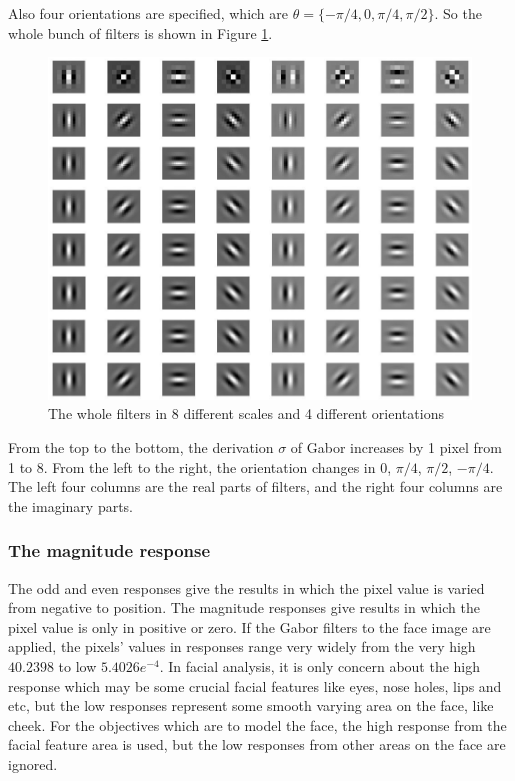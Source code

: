 Also four orientations are specified, which are $\theta=\{-\pi/4, 0,\pi/4, \pi/2 \}$. So the whole bunch of filters is shown in \mbox{Figure} \ref{fig:allgabors}.
\begin{figure}[ht]
 \includegraphics[width=\columnwidth]{ch3/figures/allgabors.png}
\caption{The whole filters in 8 different scales and 4 different orientations}
\label{fig:allgabors}
\end{figure} 
From the top to the bottom, the derivation $\sigma$ of Gabor increases by 1 pixel from 1 to 8. From the left to the right, the orientation changes in $0$, $\pi/4$, $\pi/2$, $-\pi/4$. The left four columns are the real parts of filters, and the right four columns are the imaginary parts.

\subsubsection{The magnitude response}
The odd and even responses give the results in which the pixel value is varied from negative to position. The magnitude responses give results in which the pixel value is only in positive or zero. If the Gabor filters to the face image are applied, the pixels' values in responses range very widely from the very high  $40.2398$ to low $5.4026e^{-4}$. In facial analysis, it is only concern about the high response which may be some crucial facial features like eyes, nose holes, lips and etc, but the low responses represent some smooth varying area on the face, like cheek. For the objectives which are to model the face, the high response from the facial feature area is used, but the low responses from other areas on the face are ignored.

